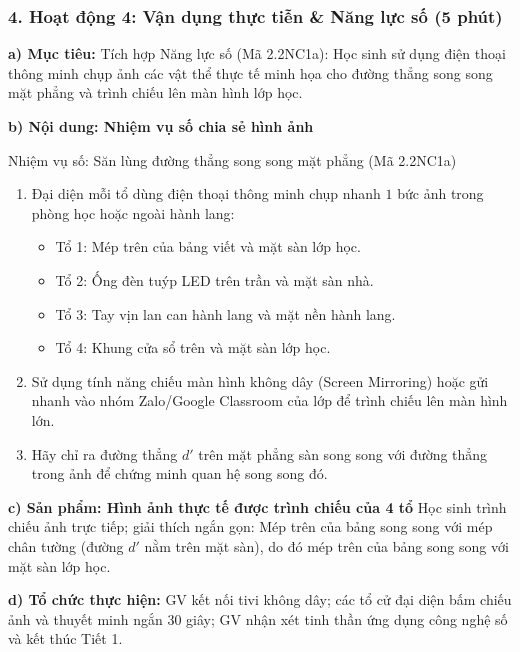 \documentclass[12pt, a4paper]{article}
\begin{document}
\subsubsection*{4. Hoạt động 4: Vận dụng thực tiễn & Năng lực số (5 phút)}

\noindent \textbf{a) Mục tiêu:}
Tích hợp Năng lực số (Mã 2.2NC1a): Học sinh sử dụng điện thoại thông minh chụp ảnh các vật thể thực tế minh họa cho đường thẳng song song mặt phẳng và trình chiếu lên màn hình lớp học.

\noindent \textbf{b) Nội dung: Nhiệm vụ số chia sẻ hình ảnh}
\begin{aibox}{Nhiệm vụ số: Săn lùng đường thẳng song song mặt phẳng (Mã 2.2NC1a)}
\begin{enumerate}[leftmargin=0.6cm]
    \item Đại diện mỗi tổ dùng điện thoại thông minh chụp nhanh $1$ bức ảnh trong phòng học hoặc ngoài hành lang:
    \begin{itemize}
        \item Tổ 1: Mép trên của bảng viết và mặt sàn lớp học.
        \item Tổ 2: Ống đèn tuýp LED trên trần và mặt sàn nhà.
        \item Tổ 3: Tay vịn lan can hành lang và mặt nền hành lang.
        \item Tổ 4: Khung cửa sổ trên và mặt sàn lớp học.
    \end{itemize}
    \item Sử dụng tính năng chiếu màn hình không dây (Screen Mirroring) hoặc gửi nhanh vào nhóm Zalo/Google Classroom của lớp để trình chiếu lên màn hình lớn.
    \item Hãy chỉ ra đường thẳng $d'$ trên mặt phẳng sàn song song với đường thẳng trong ảnh để chứng minh quan hệ song song đó.
\end{enumerate}
\end{aibox}

\noindent \textbf{c) Sản phẩm: Hình ảnh thực tế được trình chiếu của 4 tổ}
Học sinh trình chiếu ảnh trực tiếp; giải thích ngắn gọn: Mép trên của bảng song song với mép chân tường (đường $d'$ nằm trên mặt sàn), do đó mép trên của bảng song song với mặt sàn lớp học.

\noindent \textbf{d) Tổ chức thực hiện:}
GV kết nối tivi không dây; các tổ cử đại diện bấm chiếu ảnh và thuyết minh ngắn 30 giây; GV nhận xét tinh thần ứng dụng công nghệ số và kết thúc Tiết 1.

\newpage
\end{document}
